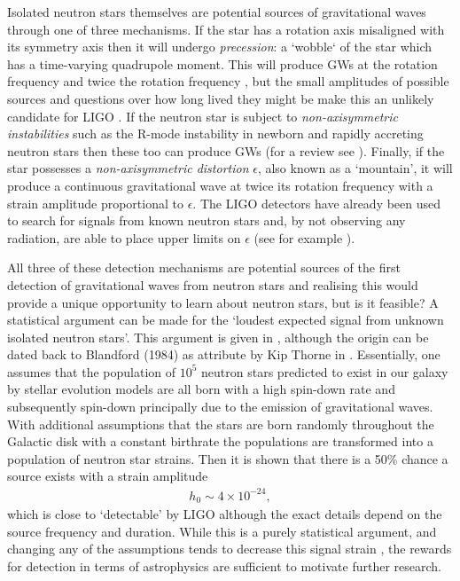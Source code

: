 Isolated neutron stars themselves are potential sources of gravitational waves
through one of three mechanisms. If the star has a rotation axis misaligned
with its symmetry axis then it will undergo \emph{precession}: a `wobble` of
the star which has a time-varying quadrupole moment. This will produce GWs at
the rotation frequency and twice the rotation frequency , but the small
amplitudes of possible sources and questions over how long lived they might be
make this an unlikely candidate for LIGO \citep{Jones2002}. If the neutron star
is subject to \emph{non-axisymmetric instabilities} such as the R-mode
instability in newborn and rapidly accreting neutron stars
\citep{andersson2001r} then these too can produce GWs (for a review see
\citet{andersson2003gravitational}).  Finally, if the star possesses a
\emph{non-axisymmetric distortion} $\epsilon$, also known as a `mountain', it
will produce a continuous gravitational wave at twice its rotation frequency
with a strain amplitude proportional to $\epsilon$. The LIGO detectors have
already been used to search for signals from known neutron stars and, by not
observing any radiation, are able to place upper limits on $\epsilon$ (see for
example \citet{ligo2008, ligo2011}).

All three of these detection mechanisms are potential sources of the first detection
of gravitational waves from neutron stars and realising this would provide a
unique opportunity to learn about neutron stars, but is it feasible? A statistical
argument can be made for the `loudest expected signal from unknown isolated
neutron stars'. This argument is given in \citet{abbott2007searches},
although the origin can be dated back to Blandford (1984) as attribute by Kip Thorne
in \citet{Hawking1989}. Essentially, one assumes that the population of $10^{5}$
neutron stars predicted to exist in our galaxy by stellar evolution models are
all born with a high spin-down rate and subsequently spin-down principally due to
the emission of gravitational waves. With additional assumptions that the stars
are born randomly throughout the Galactic disk with a constant birthrate the
populations are transformed into a population of neutron star strains. Then it
is shown that there is a 50\% chance a source exists with a strain amplitude
\begin{align}
h_0 \sim 4 \times 10^{-24},
\end{align}
which is close to `detectable' by LIGO although the exact details depend on the
source frequency and duration. While this is a purely statistical argument, and
changing any of the assumptions tends to decrease this signal strain
\citep{Prix2009}, the rewards for detection in terms of astrophysics are
sufficient to motivate further research.

